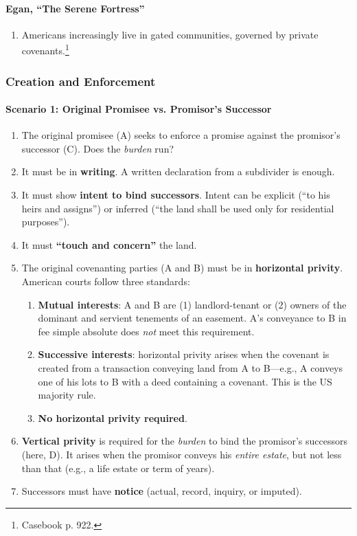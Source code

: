 \paragraph{Egan, ``The Serene Fortress''}

\begin{enumerate}
    \item Americans increasingly live in gated communities, governed by 
    private covenants.\footnote{Casebook p. 922.}
\end{enumerate}

\subsubsection{Creation and Enforcement}

\paragraph{Scenario 1: Original Promisee vs. Promisor's Successor}

\begin{enumerate}
    \item The original promisee (A) seeks to enforce a promise against the 
    promisor's  successor (C). Does the \emph{burden} run?
    \item It must be in \textbf{writing}. A written declaration from a 
    subdivider is enough.
    \item It must show \textbf{intent to bind successors}. Intent can be 
    explicit (``to his heirs and assigns'') or inferred (``the land shall be 
    used only for residential purposes'').
    \item It must \textbf{``touch and concern''} the land.
    \item The original covenanting parties (A and B) must be in 
    \textbf{horizontal privity}. American courts follow three standards:
    \begin{enumerate}
        \item \textbf{Mutual interests}: A and B are (1) landlord-tenant or 
        (2) owners of the dominant and servient tenements of an easement. A's 
        conveyance to B in fee simple absolute does \emph{not} meet this 
        requirement.
        \item \textbf{Successive interests}: horizontal privity arises when 
        the covenant is created from a transaction conveying land from A to 
        B---e.g., A conveys one of his lots to B with a deed containing a 
        covenant. This is the US majority rule.
        \item \textbf{No horizontal privity required}.
    \end{enumerate}
    \item \textbf{Vertical privity} is required for the \emph{burden} to bind 
    the promisor's successors (here, D). It arises when the promisor conveys 
    his \emph{entire estate}, but not less than that (e.g., a life estate or 
    term of years).
    \item Successors must have \textbf{notice} (actual, record, inquiry, or 
    imputed).
\end{enumerate}

